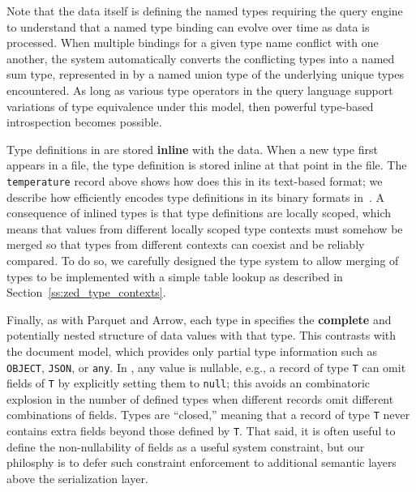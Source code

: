 Note that the data itself is defining the named types requiring the query engine to understand that a named type binding can evolve over time as data is processed.  When multiple bindings for a given type name conflict with one another, the system automatically converts the conflicting types into a named sum type, represented in \sys{} by a named union type of the underlying unique types encountered.  As long as various type operators in the query language support variations of type equivalence under this model, then powerful type-based introspection becomes possible. 

Type definitions in \sys{} are stored {\bf inline} with the data. When a new type first appears in a \sys{} file, the type definition is stored inline at that point in the file. The \texttt{temperature} record above shows how \sys{} does this in its text-based format; we describe  how \sys{} efficiently encodes type definitions in its binary formats in~. A consequence of inlined types is that type definitions are locally scoped, which means that values from different locally scoped type contexts must somehow be merged so that types from different contexts can coexist and be reliably compared. To do so, we carefully designed the \sys{} type system to allow merging of types to be implemented with a simple table lookup as described in Section~\ref{ss:zed_type_contexts}.

Finally, as with Parquet and Arrow, each type in \sys{} specifies the {\bf complete} and potentially nested structure of data values with that type. This contrasts with the document model, which provides only partial type information such as \texttt{OBJECT}, \texttt{JSON}, or \texttt{any}. In \sys{}, any value is nullable, e.g., a record of type \texttt{T} can omit fields of \texttt{T} by explicitly setting them to \texttt{null}; this avoids an combinatoric explosion in the number of defined types when different records omit different combinations of fields. Types are ``closed,'' meaning that a record of type \texttt{T} never contains extra fields beyond those defined by \texttt{T}.  That said, it is often useful to define the non-nullability of fields as a useful system constraint, but our philosphy is to defer such constraint enforcement to additional semantic layers above the \sys{} serialization layer.

